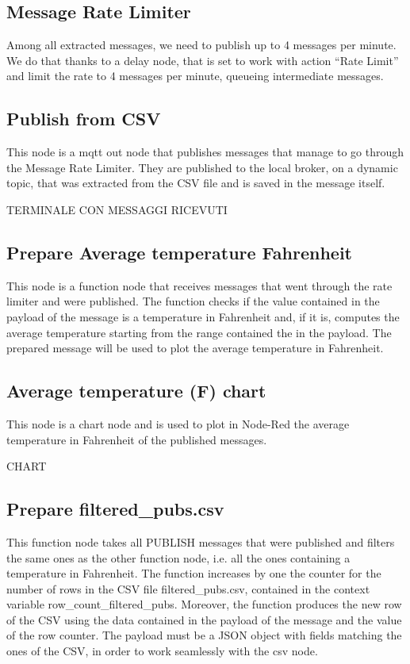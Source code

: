 \subsection{Message Rate Limiter}
Among all extracted messages, we need to publish up to 4 messages per minute. We do that thanks to a delay node, that is set to work with action “Rate Limit” and limit the rate to 4 messages per minute, queueing intermediate messages.  

\subsection{Publish from CSV}
This node is a mqtt out node that publishes messages that manage to go through the Message Rate Limiter. They are published to the local broker, on a dynamic topic, that was extracted from the CSV file and is saved in the message itself.

TERMINALE CON MESSAGGI RICEVUTI

\subsection{Prepare Average temperature Fahrenheit}
This node is a function node that receives messages that went through the rate limiter and were published. The function checks if the value contained in the payload of the message is a temperature in Fahrenheit and, if it is, computes the average temperature starting from the range contained the in the payload. The prepared message will be used to plot the average temperature in Fahrenheit.

\subsection{Average temperature (F) chart}
This node is a chart node and is used to plot in Node-Red the average temperature in Fahrenheit of the published messages.

CHART 

\subsection{Prepare filtered\_pubs.csv}
This function node takes all PUBLISH messages that were published and filters the same ones as the other function node, i.e. all the ones containing a temperature in Fahrenheit. The function increases by one the counter for the number of rows in the CSV file filtered\_pubs.csv, contained in the context variable row\_count\_filtered\_pubs. Moreover, the function produces the new row of the CSV using the data contained in the payload of the message and the value of the row counter. The payload must be a JSON object with fields matching the ones of the CSV, in order to work seamlessly with the csv node.

